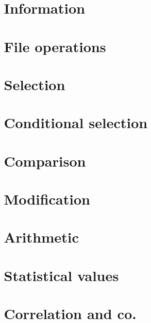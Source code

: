 \newpage
\section{Information}




\newpage
\section{File operations}




\newpage
\section{Selection}




\newpage
\section{Conditional selection}




\newpage
\section{Comparison}




\newpage
\section{Modification}




\newpage
\section{Arithmetic}




\newpage
\section{Statistical values}




\newpage
\section{Correlation and co.}




